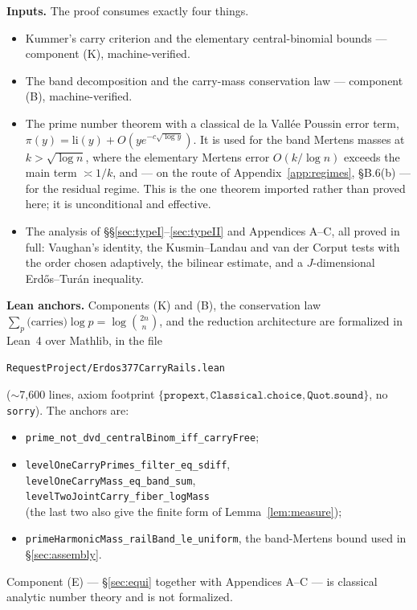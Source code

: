 \documentclass[11pt]{article}
\theoremstyle{definition}
\theoremstyle{plain}
\begin{document}
\smallskip
\noindent\textbf{Inputs.}  The proof consumes exactly four things.
\begin{itemize}
\item[(i)] Kummer's carry criterion and the elementary central-binomial
bounds --- component (K), machine-verified.
\item[(ii)] The band decomposition and the carry-mass conservation law
--- component (B), machine-verified.
\item[(iii)] The prime number theorem with a classical de la Vall\'ee
Poussin error term, $\pi(y)=\mathrm{li}(y)+O(ye^{-c\sqrt{\log y}})$.  It
is used for the band Mertens masses at $k>\sqrt{\log n}$, where the
elementary Mertens error $O(k/\log n)$ exceeds the main term $\asymp1/k$,
and --- on the route of Appendix~\ref{app:regimes}, \S B.6(b) --- for the
residual regime.  This is the one theorem imported rather than proved
here; it is unconditional and effective.
\item[(iv)] The analysis of \S\S\ref{sec:typeI}--\ref{sec:typeII} and
Appendices A--C, all proved in full: Vaughan's identity, the
Kusmin--Landau and van der Corput tests with the order chosen
adaptively, the bilinear estimate, and a $J$-dimensional
Erd\H{o}s--Tur\'an inequality.
\end{itemize}

\noindent\textbf{Lean anchors.}  Components (K) and (B), the conservation
law $\sum_{p}\bigl(\text{carries}\bigr)\log p=\log\binom{2n}{n}$, and the
reduction architecture are formalized in Lean~4 over Mathlib, in the file
\begin{center}
\texttt{RequestProject/Erdos377CarryRails.lean}
\end{center}
($\sim$7{,}600 lines, axiom footprint
$\{\texttt{propext},\texttt{Classical.choice},\texttt{Quot.sound}\}$, no
\texttt{sorry}).  The anchors are:
\begin{itemize}
\item[(K)] \texttt{prime\_not\_dvd\_centralBinom\_iff\_carryFree};
\item[(B)] \texttt{levelOneCarryPrimes\_filter\_eq\_sdiff},\\
\texttt{levelOneCarryMass\_eq\_band\_sum},\\
\texttt{levelTwoJointCarry\_fiber\_logMass}\\
(the last two also give the finite form of Lemma~\ref{lem:measure});
\item[(B$'$)] \texttt{primeHarmonicMass\_railBand\_le\_uniform}, the
band-Mertens bound used in \S\ref{sec:assembly}.
\end{itemize}
Component (E) --- \S\ref{sec:equi} together with Appendices A--C --- is
classical analytic number theory and is not formalized.
\end{document}
